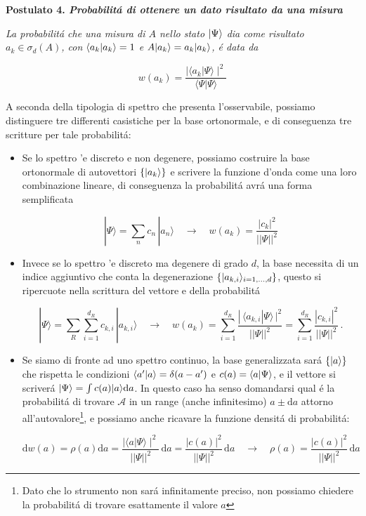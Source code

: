 \textbf{Postulato 4. \textit{Probabilit\'a di ottenere un dato risultato da una misura}}

\textit{La probabilit\'a che una misura di $A$ nello stato $\ket{\Psi}$ dia come risultato $a_k \in \sigma_d(A)$, con $\braket{a_k}{a_k} = 1$ e $A \ket{a_k} = a_k \ket{a_k}$, \'e data da}

$$w(a_{k})={\frac{\mid\langle a_{k}|\Psi\rangle\mid^{2}}{\langle\Psi|\Psi\rangle}}$$

A seconda della tipologia di spettro che presenta l'osservabile, possiamo distinguere tre differenti casistiche per la base ortonormale, e di conseguenza tre scritture per tale probabilit\'a:
\begin{itemize}
	\item Se lo spettro 'e discreto e non degenere, possiamo costruire la base ortonormale di autovettori $\{\ket{a_k}\}$ e scrivere la funzione d'onda come una loro combinazione lineare, di conseguenza la probabilit\'a avr\'a una forma semplificata

	$$|\Psi\rangle=\sum_{n}c_{n}\,|a_{n}\rangle\quad\longrightarrow\quad w(a_{k})={\frac{|c_{k}|^{2}}{||\Psi||^{2}}}$$

	\item Invece se lo spettro 'e discreto ma degenere di grado $d$, la base necessita di un indice aggiuntivo che conta la degenerazione $\{ \ket{a_{k,i}}_{i=1,...,d}\}$, questo si ripercuote nella scrittura del vettore e della probabilit\'a

	$$|\Psi\rangle=\sum_{R}\sum_{i=1}^{d_{R}}c_{k,i}\,|a_{k,i}\rangle\quad\longrightarrow\quad w(a_{k})=\sum_{i=1}^{d_{R}}\frac{|\,\langle a_{k,i}|\Psi\rangle\,|^{2}}{||\Psi||^{2}}=\sum_{i=1}^{d_{R}}\frac{|c_{k,i}|^{2}}{||\Psi||^{2}}\,.$$

	\item Se siamo di fronte ad uno spettro continuo, la base generalizzata sar\'a $\{\ket{a}\}$ che rispetta le condizioni $\braket{a^\prime}{a} = \delta(a-a^\prime)$ e $c(a) = \braket{a}{\Psi}$, e il vettore si scriver\'a $\ket{\Psi} = \int c(a)\ket{a} \mathrm{d}a$. In questo caso ha senso domandarsi qual \'e la probabilit\'a di trovare $\mathcal{A}$ in un range (anche infinitesimo) $a \pm \mathrm{d}a$ attorno all'autovalore\footnote{Dato che lo strumento non sar\'a infinitamente preciso, non possiamo chiedere la probabilit\'a di trovare esattamente il valore $a$}, e possiamo anche ricavare la funzione densit\'a di probabilit\'a:

	$$\mathrm{d} w(a)=\rho(a)\mathrm{d} a={\frac{\mid\langle a|\Psi\rangle\mid^{2}}{||\Psi||^{2}}}\,\mathrm{d}a={\frac{|c(a)|^{2}}{||\Psi||^{2}}}\,\mathrm{d}a\quad\longrightarrow\quad\rho(a)={\frac{|c(a)|^{2}}{||\Psi||^{2}}}\,\mathrm{d}a$$
\end{itemize}


